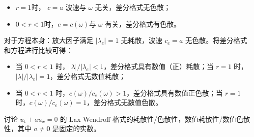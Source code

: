 \begin{solution*}
\begin{itemize}
        \item $r=1$时， $c = a$ 波速与 $\omega$ 无关，差分格式无色散；
        \item $0<r<1$时，$c = c(\omega)$与 $\omega$ 有关，差分格式有色散。
    \end{itemize}
    对于方程本身：放大因子满足 $|\lambda_e| = 1$ 无耗散，波速 $c_e = a$ 无色散。将差分格式和方程进行比较可得：
    \begin{itemize}
        \item 当 $0 < r < 1$ 时，$|\lambda| / |\lambda_e|  < 1$，差分格式具有数值（正）耗散；当 $r=1$ 时，$|\lambda| / |\lambda_e| = 1$，差分格式无数值耗散；
        \item 当 $0 < r < 1$ 时，$c(\omega) / c_e(\omega) > 1$，差分格式具有数值正色散；当 $r=1$ 时，$c(\omega) / c_e(\omega) = 1$，差分格式无数值色散。
    \end{itemize}
\end{solution*}

\begin{example}
    讨论 $u_t + a u_x = 0$ 的 Lax-Wendroff 格式的耗散性/色散性，数值耗散性/数值色散性，其中 $a \neq 0$ 是固定的实数。
\end{example}

